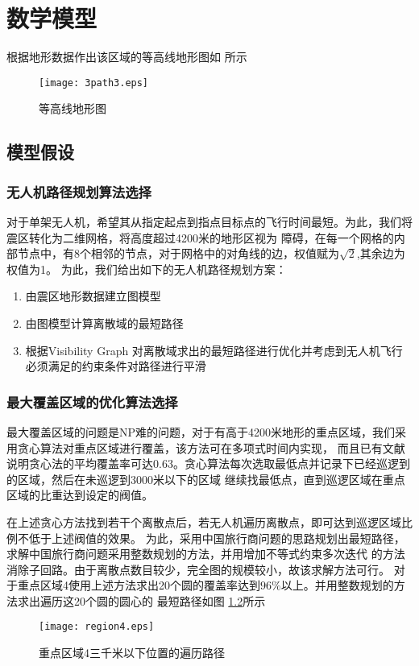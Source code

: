 \chapter{数学模型}
\label{cha:model}
根据地形数据作出该区域的等高线地形图如 所示
\begin{figure}[!ht]
\centering
\texttt{[image: 3path3.eps]}
\caption{等高线地形图}\label{fig:3path}
\end{figure}

\section{模型假设}
\subsection{无人机路径规划算法选择}
对于单架无人机，希望其从指定起点到指点目标点的飞行时间最短。为此，我们将震区转化为二维网格，将高度超过4200米的地形区视为
障碍，在每一个网格的内部节点中，有8个相邻的节点，对于网格中的对角线的边，权值赋为$\sqrt{2}$,其余边为权值为1。
为此，我们给出如下的无人机路径规划方案：
\begin{enumerate}
\item 由震区地形数据建立图模型
\item 由图模型计算离散域的最短路径
\item 根据Visibility Graph 对离散域求出的最短路径进行优化并考虑到无人机飞行必须满足的约束条件对路径进行平滑
\end{enumerate}
\subsection{最大覆盖区域的优化算法选择}
最大覆盖区域的问题是NP难的问题，对于有高于4200米地形的重点区域，我们采用贪心算法对重点区域进行覆盖，该方法可在多项式时间内实现，
而且已有文献说明贪心法的平均覆盖率可达0.63\cite{Feige1998A}。贪心算法每次选取最低点并记录下已经巡逻到的区域，然后在未巡逻到3000米以下的区域
继续找最低点，直到巡逻区域在重点区域的比重达到设定的阀值。

在上述贪心方法找到若干个离散点后，若无人机遍历离散点，即可达到巡逻区域比例不低于上述阀值的效果。
为此，采用中国旅行商问题的思路规划出最短路径，求解中国旅行商问题采用整数规划的方法，并用增加不等式约束多次迭代
的方法消除子回路。由于离散点数目较少，完全图的规模较小，故该求解方法可行。
对于重点区域4使用上述方法求出20个圆的覆盖率达到$96\%$以上。并用整数规划的方法求出遍历这20个圆的圆心的
最短路径如图 \ref{fig:region4}所示
\begin{figure}[!ht]
\centering
\texttt{[image: region4.eps]}
\caption{重点区域4三千米以下位置的遍历路径}\label{fig:region4}
\end{figure}

